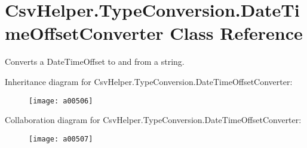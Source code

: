 \hypertarget{a00075}{\section{Csv\-Helper.\-Type\-Conversion.\-Date\-Time\-Offset\-Converter Class Reference}
\label{a00075}
}


Converts a Date\-Time\-Offset to and from a string.  




Inheritance diagram for Csv\-Helper.\-Type\-Conversion.\-Date\-Time\-Offset\-Converter\-:
\nopagebreak
\begin{figure}[H]
\begin{center}
\leavevmode
\texttt{[image: a00506]}
\end{center}
\end{figure}


Collaboration diagram for Csv\-Helper.\-Type\-Conversion.\-Date\-Time\-Offset\-Converter\-:
\nopagebreak
\begin{figure}[H]
\begin{center}
\leavevmode
\texttt{[image: a00507]}
\end{center}
\end{figure}
